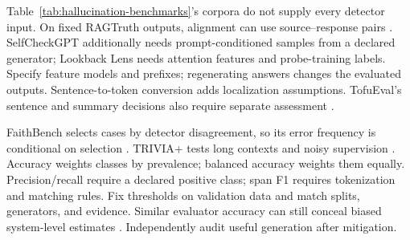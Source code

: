Table~\ref{tab:hallucination-benchmarks}'s corpora do not supply every detector input. On fixed RAGTruth outputs, alignment can use source--response pairs \citep{niu-etal-2024-ragtruth}. SelfCheckGPT additionally needs prompt-conditioned samples from a declared generator; Lookback Lens needs attention features and probe-training labels. Specify feature models and prefixes; regenerating answers changes the evaluated outputs. Sentence-to-token conversion adds localization assumptions. TofuEval's sentence and summary decisions also require separate assessment \citep{tang-etal-2024-tofueval}.

FaithBench selects cases by detector disagreement, so its error frequency is conditional on selection \citep{bao-etal-2025-faithbench}. TRIVIA+ tests long contexts and noisy supervision \citep{chen-etal-2026-rethinking-evaluation}. Accuracy weights classes by prevalence; balanced accuracy weights them equally. Precision/recall require a declared positive class; span F1 requires tokenization and matching rules. Fix thresholds on validation data and match splits, generators, and evidence. Similar evaluator accuracy can still conceal biased system-level estimates \citep{godbole-jia-2025-verify}. Independently audit useful generation after mitigation.

